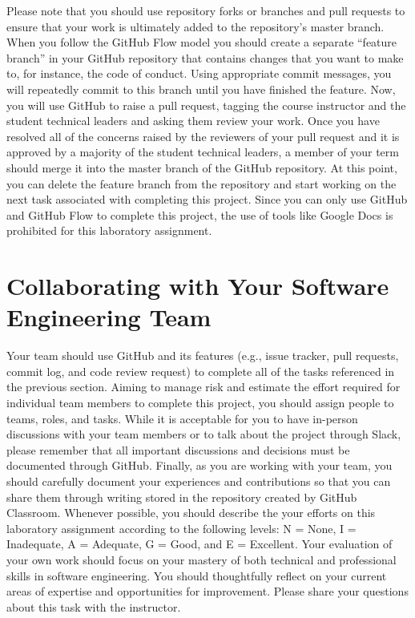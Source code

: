 \documentclass[11pt]{article}
\begin{document}
Please note that you should use repository forks or branches and pull requests
to ensure that your work is ultimately added to the repository's master branch.
%
When you follow the GitHub Flow model you should create a separate ``feature
branch'' in your GitHub repository that contains changes that you want to make
to, for instance, the code of conduct. Using appropriate commit messages, you
will repeatedly commit to this branch until you have finished the feature. Now,
you will use GitHub to raise a pull request, tagging the course instructor and
the student technical leaders and asking them review your work. Once you have
resolved all of the concerns raised by the reviewers of your pull request and it
is approved by a majority of the student technical leaders, a member of your
term should merge it into the master branch of the GitHub repository. At this
point, you can delete the feature branch from the repository and start working
on the next task associated with completing this project.
%
Since you can only use GitHub and GitHub Flow to complete this project, the use
of tools like Google Docs is prohibited for this laboratory assignment.

\section*{Collaborating with Your Software Engineering Team}

Your team should use GitHub and its features (e.g., issue tracker, pull
requests, commit log, and code review request) to complete all of the tasks
referenced in the previous section.
%
Aiming to manage risk and estimate the effort required for individual team
members to complete this project, you should assign people to teams, roles, and
tasks. While it is acceptable for you to have in-person discussions with your
team members or to talk about the project through Slack, please remember that
all important discussions and decisions must be documented through GitHub.
Finally, as you are working with your team, you should carefully document your
experiences and contributions so that you can share them through writing stored
in the repository created by GitHub Classroom.
%
Whenever possible, you should describe the your efforts on this laboratory
assignment according to the following levels: N = None, I = Inadequate, A =
Adequate, G = Good, and E = Excellent. Your evaluation of your own work should
focus on your mastery of both technical and professional skills in software
engineering. You should thoughtfully reflect on your current areas of expertise
and opportunities for improvement. Please share your questions about this task
with the instructor.
\end{document}
